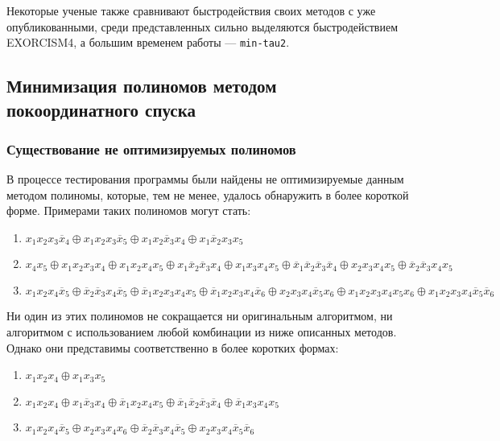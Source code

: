 \documentclass[a4paper,12pt,titlepage,finall]{article}
\begin{document}
Некоторые ученые также сравнивают быстродействия своих методов с уже опубликованными, среди представленных сильно выделяются быстродействием \textsc{EXORCISM4}, а большим временем работы --- \texttt{min-tau2}.

\subsection{Минимизация полиномов методом покоординатного спуска}

\subsubsection{Существование не оптимизируемых полиномов}

В процессе тестирования программы были найдены не оптимизируемые данным методом полиномы, которые, тем не менее, удалось обнаружить в более короткой форме. Примерами таких полиномов могут стать:
\begin{enumerate}
    \item $ x_1 x_2 x_3 \overline x_4 \oplus x_1 x_2 x_3 \overline x_5 \oplus x_1 x_2 \overline x_3 x_4 \oplus x_1 \overline x_2 x_3 x_5 $
    \item $ x_4 x_5 \oplus x_1 x_2 x_3 x_4 \oplus x_1 x_2 x_4 x_5 \oplus x_1 \overline x_2 \overline x_3 x_4 \oplus x_1 x_3 x_4 x_5 \oplus \overline x_1 \overline x_2 \overline x_3 \overline x_4 \oplus x_2 x_3 x_4 x_5 \oplus \overline x_2 \overline x_3 x_4 x_5 $
    \item $ x_1 x_2 x_4 \overline x_5 \oplus \overline x_2 \overline x_3 x_4 \overline x_5 \oplus \overline x_1 x_2 x_3 x_4 x_5 \oplus \overline x_1 x_2 x_3 x_4 \overline x_6 \oplus x_2 x_3 x_4 \overline x_5 x_6 \oplus x_1 x_2 x_3 x_4 x_5 x_6 \oplus x_1 x_2 x_3 x_4 \overline x_5 \overline x_6 $
\end{enumerate}

Ни один из этих полиномов не сокращается ни оригинальным алгоритмом, ни алгоритмом с использованием любой комбинации из ниже описанных методов. Однако они представимы соответственно в более коротких формах:
\begin{enumerate}
    \item $ x_1 x_2 x_4 \oplus x_1 x_3 x_5 $
    \item $ x_1 x_2 x_4 \oplus x_1 \overline x_3 x_4 \oplus \overline x_1 x_2 x_4 x_5 \oplus \overline x_1 \overline x_2 \overline x_3 \overline x_4 \oplus \overline x_1 x_3 x_4 x_5 $
    \item $ x_1 x_2 x_4 \overline x_5 \oplus x_2 x_3 x_4 x_6 \oplus \overline x_2 \overline x_3 x_4 \overline x_5 \oplus x_2 x_3 x_4 \overline x_5 \overline x_6 $
\end{enumerate}
\end{document}
